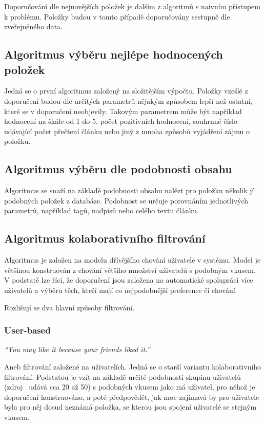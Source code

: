 \documentclass[thesis=M,czech]{FITthesis}[2014/05/07]
\begin{document}
Doporučování dle nejnovějších položek je dalším z algoritmů s naivním přístupem k problému. Položky budou v tomto případě doporučovány sestupně dle zveřejněného data. 

\subsection{Algoritmus výběru nejlépe hodnocených položek}

Jedná se o první algoritmus založený na složitějším výpočtu. Položky vzešlé z doporučení budou dle určitých parametrů nějakým způsobem lepší než ostatní, které se v doporučení neobjevily. Takovým parametrem může být například hodnocení na škále od 1 do 5, počet pozitivních hodnocení, souhrnné číslo udávající počet přečtení článku nebo jiný z mnoha způsobů vyjádření zájmu o položku. 

\subsection{Algoritmus výběru dle podobnosti obsahu}

Algoritmus se snaží na základě podobnosti obsahu nalézt pro položku několik jí podobných položek z databáze. Podobnost se určuje porovnáním jednotlivých parametrů, například tagů, nadpisů nebo celého textu článku.

\subsection{Algoritmus kolaborativního filtrování}

Algoritmus je založen na modelu dřívějšího chování uživatele v systému. Model je většinou konstruován z chování většího množství uživatelů s podobným vkusem. V podstatě lze říci, že doporučení jsou založena na automatické spolupráci více uživatelů a výběru těch, kteří mají co nejpodobnější preference či chování.

Rozlišují se dva hlavní způsoby filtrování.

\subsubsection{User-based}

\emph{``You may like it because your friends liked it.''}~\cite{cf}

Aneb filtrování založené na uživatelích. Jedná se o starší variantu kolaborativního filtrování. Podstatou je vzít na základě určité podobnosti skupinu uživatelů (zdroj~\cite{cf} udává cca 20 až 50) s podobných vkusem jako má uživatel, pro něhož je doporučení konstruováno, a poté předpovědět, jak moc zajímavá by pro uživatele byla pro něj dosud neznámá položka, se kterou jsou spojení uživatelé se stejným vkusem.
\end{document}
